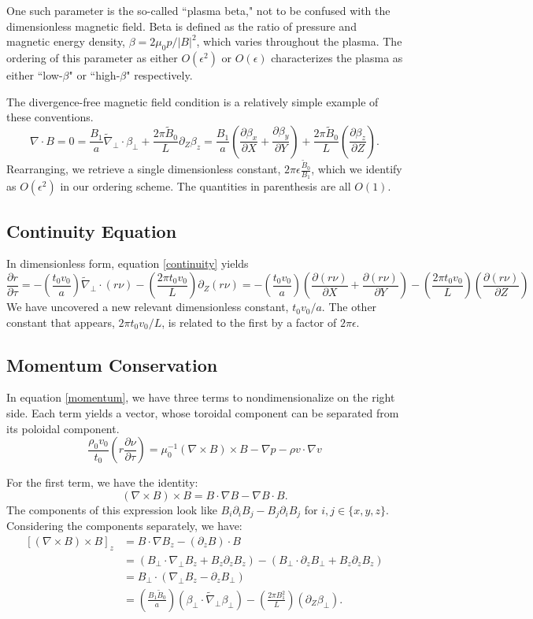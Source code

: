 \documentclass{article}
\newcommand{\ep}{\epsilon}
\newcommand{\np}{\nabla_\perp}
\newcommand{\p}{\partial}
\newcommand{\til}[1]{\widetilde{ #1 }}
\newcommand{\deriv}[2]{\frac{\p #1}{\p #2}}
\newcommand{\pth} [1] {\left( #1 \right) }
\begin{document}
One such parameter is the so-called ``plasma beta," not to be confused with the dimensionless magnetic field. Beta is defined as the ratio of pressure and magnetic energy density, $\beta = 2\mu_0p/|B|^2$, which varies throughout the plasma. The ordering of this parameter as either $O(\ep^2)$ or $O(\ep)$ characterizes the plasma as either ``low-$\beta$" or ``high-$\beta$" respectively. 

The divergence-free magnetic field condition is a relatively simple example of these conventions. 
$$\nabla\cdot B=0 = \frac{B_1}{a}\til{\nabla}_\perp \cdot\beta_\perp + \frac{2\pi\til{B}_0}{L}\p_Z\beta_z = \frac{B_1}{a}\pth{\deriv{\beta_x}{X} + \deriv{\beta_y}{Y}} + \frac{2\pi\til{B}_0}{L} \pth{\deriv{\beta_z}{Z}}.$$
Rearranging, we retrieve a single dimensionless constant, $2\pi\ep\frac{\til{B}_0}{B_1}$, which we identify as $O(\ep^2)$ in our ordering scheme. The quantities in parenthesis are all $O(1)$. 


\subsection{Continuity Equation}
In dimensionless form, equation \eqref{continuity} yields
\begin{equation} 
    \deriv{r}{\tau} = -\pth{\frac{t_0v_0}{a}} \til{\nabla}_\perp\cdot(r\nu) - \pth{\frac{2\pi t_0v_0}{L}} \p_Z(r\nu) 
    = -\pth{\frac{t_0v_0}{a}} \pth{\deriv{(r\nu)}{X} + \deriv{(r\nu)}{Y}} - \pth{\frac{2\pi t_0v_0}{L}} \pth{\deriv{(r\nu)}{Z}} 
\end{equation}
We have uncovered a new relevant dimensionless constant, $t_0v_0/a$. The other constant that appears, $2\pi t_0v_0/L$, is related to the first by a factor of $2\pi\ep$. 


\subsection{Momentum Conservation}
In equation \eqref{momentum}, we have three terms to nondimensionalize on the right side. Each term yields a vector, whose toroidal component can be separated from its poloidal component. 
$$\frac{\rho_0v_0}{t_0}\pth{r\deriv{\nu}{\tau}} = \mu_0^{-1}(\nabla\times B)\times B - \nabla p - \rho v\cdot\nabla v $$ 

For the first term, we have the identity: 
$$(\nabla\times B)\times B = B\cdot\nabla B - \nabla B\cdot B. $$
The components of this expression look like $B_i\p_iB_j - B_j\p_iB_j$ for $i,j\in\{x,y,z\}$. Considering the components separately, we have: 
\begin{equation} \begin{split}
    [(\nabla\times B)\times B]_z &= B\cdot\nabla B_z - (\p_zB)\cdot B \\
    &= (B_\perp\cdot\np B_z + B_z\p_zB_z) - (B_\perp\cdot \p_zB_\perp + B_z\p_zB_z) \\
    &= B_\perp\cdot(\np B_z - \p_zB_\perp) \\ 
    &= \pth{\frac{B_1 \til{B}_0}{a}} \pth{\beta_\perp \cdot \til{\nabla}_\perp\beta_\perp} - \pth{\frac{2\pi B_1^2}{L}} \pth{\p_Z\beta_\perp}. 
\end{split} \end{equation}
\end{document}

